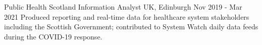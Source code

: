  \cventry
{Public Health Scotland} %
{Information Analyst} %
{UK, Edinburgh} %
{Nov 2019 - Mar 2021} %
{
Produced reporting and real-time data for healthcare system stakeholders including the Scottish Government; contributed to System Watch daily data feeds during the COVID-19 response.
}
